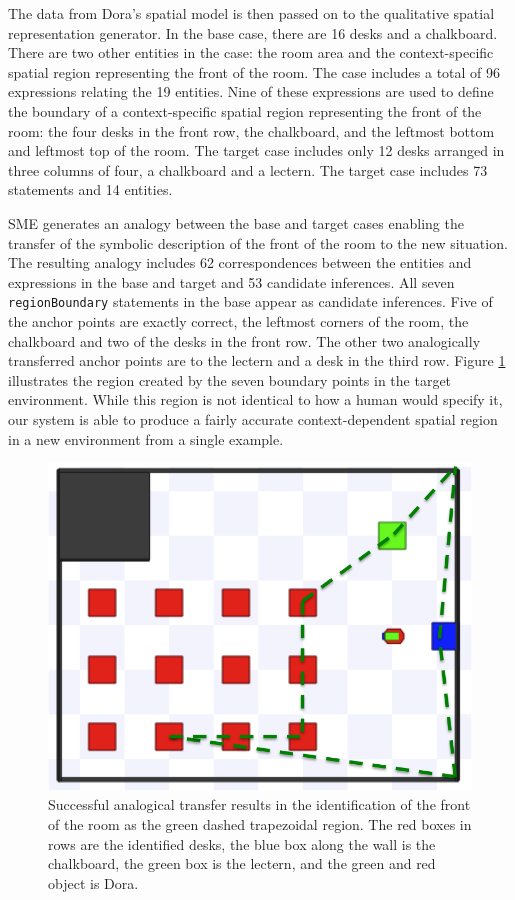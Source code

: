 \documentclass[letterpaper]{article}
\newcommand{\fw}[1]{\texttt{#1}}
\begin{document}
The data from Dora's spatial model is then passed on to the qualitative spatial representation generator. In the base case, there are 16 desks and a chalkboard. There are two other entities in the case: the room area and the context-specific spatial region representing the front of the room. The case includes a total of 96 expressions relating the 19 entities. Nine of these expressions are used to define the boundary of a context-specific spatial region representing the front of the room: the four desks in the front row, the chalkboard, and the leftmost bottom and leftmost top of the room. The target case includes only 12 desks arranged in three columns of four, a chalkboard and a lectern. The target case includes 73 statements and 14 entities.

SME generates an analogy between the base and target cases enabling the transfer of the symbolic description of the front of the room to the new situation. The resulting analogy includes 62 correspondences between the entities and expressions in the base and target and 53 candidate inferences.  All seven \fw{regionBoundary} statements in the base appear as candidate inferences. Five of the anchor points are exactly correct, the leftmost corners of the room, the chalkboard and two of the desks in the front row. The other two analogically transferred anchor points are to the lectern and a desk in the third row. Figure \ref{fig:success} illustrates the region created by the seven boundary points in the target environment. While this region is not identical to how a human would specify it, our system is able to produce a fairly accurate context-dependent spatial region in a new environment from a single example.

\begin{figure}[h]
  \includegraphics[width=\columnwidth]{images/target-success.png}
  \caption{Successful analogical transfer results in the identification of the front of the room as the green dashed trapezoidal region. The red boxes in rows are the identified desks, the blue box along the wall is the chalkboard, the green box is the lectern, and the green and red object is Dora.}
  \label{fig:success}
\end{figure}
\end{document}
